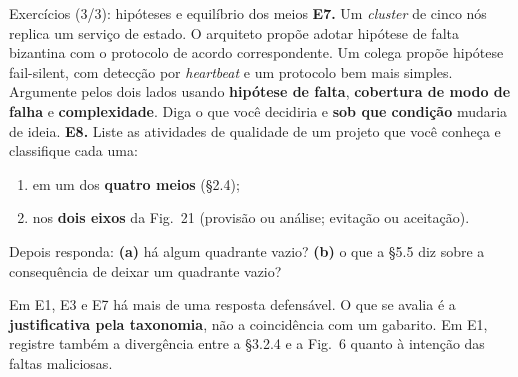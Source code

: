 \documentclass{beamer}
\begin{document}
\begin{frame}{Exerc\'icios (3/3): hip\'oteses e equil\'ibrio dos meios}
    \footnotesize
    \textbf{E7.} Um \textit{cluster} de cinco n\'os replica um servi\c{c}o de estado. O arquiteto prop\~oe adotar hip\'otese de falta bizantina com o protocolo de acordo correspondente. Um colega prop\~oe hip\'otese fail-silent, com detec\c{c}\~ao por \textit{heartbeat} e um protocolo bem mais simples.\\
    Argumente pelos dois lados usando \textbf{hip\'otese de falta}, \textbf{cobertura de modo de falha} e \textbf{complexidade}. Diga o que voc\^e decidiria e \textbf{sob que condi\c{c}\~ao} mudaria de ideia.
    \medskip
    \textbf{E8.} Liste as atividades de qualidade de um projeto que voc\^e conhe\c{c}a e classifique cada uma:
    \begin{enumerate}
        \item em um dos \textbf{quatro meios} (\S2.4);
        \item nos \textbf{dois eixos} da Fig.\ 21 (provis\~ao ou an\'alise; evita\c{c}\~ao ou aceita\c{c}\~ao).
    \end{enumerate}
    Depois responda: \textbf{(a)} h\'a algum quadrante vazio? \textbf{(b)} o que a \S5.5 diz sobre a consequ\^encia de deixar um quadrante vazio?
    \medskip
    \begin{ancora}
        \scriptsize
        Em E1, E3 e E7 h\'a mais de uma resposta defens\'avel. O que se avalia \'e a \textbf{justificativa pela taxonomia}, n\~ao a coincid\^encia com um gabarito. Em E1, registre tamb\'em a diverg\^encia entre a \S3.2.4 e a Fig.\ 6 quanto \`a inten\c{c}\~ao das faltas maliciosas.
    \end{ancora}
\end{frame}
\end{document}
